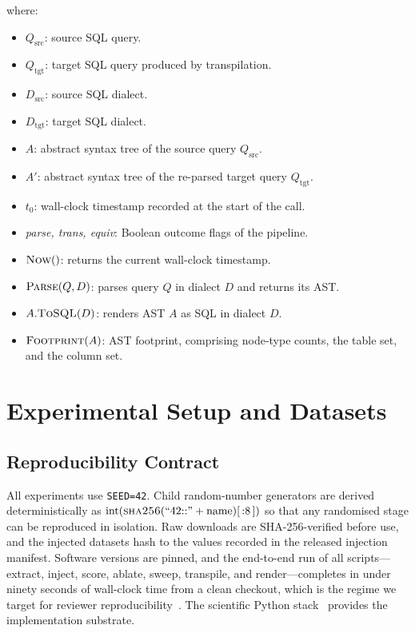 \documentclass{ieeeaccess}
\begin{document}
\noindent where:
\begin{itemize}\setlength{\itemsep}{0pt}\setlength{\parskip}{0pt}
\item $Q_{\mathrm{src}}$: source SQL query.
\item $Q_{\mathrm{tgt}}$: target SQL query produced by transpilation.
\item $D_{\mathrm{src}}$: source SQL dialect.
\item $D_{\mathrm{tgt}}$: target SQL dialect.
\item $A$: abstract syntax tree of the source query $Q_{\mathrm{src}}$.
\item $A'$: abstract syntax tree of the re-parsed target query $Q_{\mathrm{tgt}}$.
\item $t_0$: wall-clock timestamp recorded at the start of the call.
\item \textit{parse, trans, equiv}: Boolean outcome flags of the pipeline.
\item $\textsc{Now}()$: returns the current wall-clock timestamp.
\item $\textsc{Parse}(Q, D)$: parses query $Q$ in dialect $D$ and returns its AST.
\item $A.\textsc{ToSQL}(D)$: renders AST $A$ as SQL in dialect $D$.
\item $\textsc{Footprint}(A)$: AST footprint, comprising node-type counts, the table set, and the column set.
\end{itemize}

\section{Experimental Setup and Datasets}
\label{sec:setup}

\subsection{Reproducibility Contract}

All experiments use \texttt{SEED=42}. Child random-number generators are derived
deterministically as $\mathrm{int}(\textsc{sha256}(\text{``42::''} + \text{name})[\,{:}8\,])$
so that any randomised stage can be reproduced in isolation. Raw downloads are
SHA-256-verified before use, and the injected datasets hash to the values recorded
in the released injection manifest. Software versions are pinned, and the
end-to-end run of all scripts---extract, inject, score, ablate, sweep, transpile,
and render---completes in under ninety seconds of wall-clock time from a clean
checkout, which is the regime we target for reviewer
reproducibility~\cite{pineau2021improving}. The scientific Python
stack~\cite{pedregosa2011scikit, harris2020array} provides the implementation
substrate.
\end{document}
